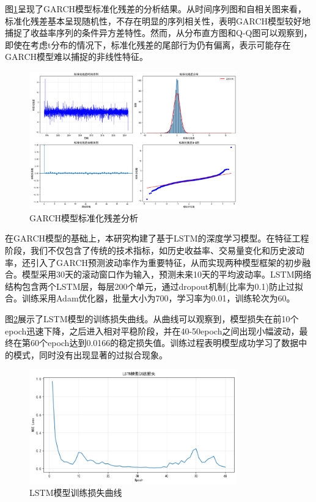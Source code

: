 \documentclass[12pt, a4paper]{article}
\begin{document}
图\ref{fig:garch_std_resid}呈现了GARCH模型标准化残差的分析结果。从时间序列图和自相关图来看，标准化残差基本呈现随机性，不存在明显的序列相关性，表明GARCH模型较好地捕捉了收益率序列的条件异方差特性。然而，从分布直方图和Q-Q图可以观察到，即使在考虑t分布的情况下，标准化残差的尾部行为仍有偏离，表示可能存在GARCH模型难以捕捉的非线性特征。

\begin{figure}[htbp]
\centering
\includegraphics[width=0.8\textwidth]{./img/标准化残差分析.png}
\caption{GARCH模型标准化残差分析}
\label{fig:garch_std_resid}
\end{figure}

在GARCH模型的基础上，本研究构建了基于LSTM的深度学习模型。在特征工程阶段，我们不仅包含了传统的技术指标，如历史收益率、交易量变化和历史波动率，还引入了GARCH预测波动率作为重要特征，从而实现两种模型框架的初步融合。模型采用30天的滚动窗口作为输入，预测未来10天的平均波动率。LSTM网络结构包含两个LSTM层，每层200个单元，通过dropout机制(比率为0.1)防止过拟合。训练采用Adam优化器，批量大小为700，学习率为0.01，训练轮次为60。

图\ref{fig:lstm_train_loss}展示了LSTM模型的训练损失曲线。从曲线可以观察到，模型损失在前10个epoch迅速下降，之后进入相对平稳阶段，并在40-50epoch之间出现小幅波动，最终在第60个epoch达到0.0166的稳定损失值。训练过程表明模型成功学习了数据中的模式，同时没有出现显著的过拟合现象。

\begin{figure}[htbp]
\centering
\includegraphics[width=0.8\textwidth]{./img/LSTM训练损失.png}
\caption{LSTM模型训练损失曲线}
\label{fig:lstm_train_loss}
\end{figure}
\end{document}
